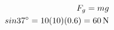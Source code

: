 \documentclass[preview]{standalone}
\begin{document}
\begin{align*}
\special{dvisvgm:raw <g id='unique000'>}F_g = mg \\sin 37^{\circ} = 10(10)(0.6) = 60\,\mathrm{N}\special{dvisvgm:raw </g>}
\end{align*}
\end{document}
